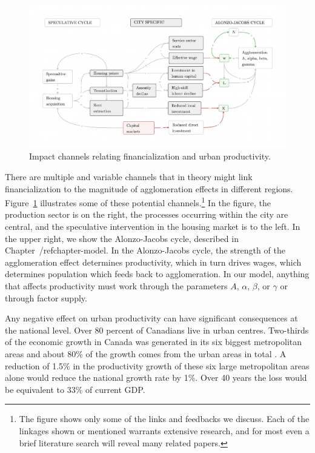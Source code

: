 \begin{figure}[h!tb]\label{fig-impact-channels}
\begin{adjustwidth}{-0.24\textwidth}{-0.24\textwidth}
\centering
\includegraphics[scale=.15 ]{fig/impact-channels.png}%
\end{adjustwidth}
\caption{Impact channels relating financialization and urban productivity.}
\end{figure}

There are multiple and variable channels that in theory might link financialization to the magnitude of agglomeration effects in different regions. Figure~\ref{fig-impact-channels} illustrates some of these potential channels.\footnote{The figure shows only some of the links and feedbacks we discuss. Each of the linkages shown or mentioned warrants extensive research, and for most even a brief literature search will reveal many related papers.} 
In the figure, the production sector is on the right, the processes occurring within the city are central, and the speculative intervention in the housing market is to the left. In the upper right, we show the \gls{Alonzo-Jacobs cycle}, described in Chapter~/ref{chapter-model}. In the Alonzo-Jacobs cycle, the strength of the agglomeration effect determines productivity, which in turn drives wages, which determines population which feeds back to agglomeration. In our model, anything that affects productivity must work through the parameters $A$, $\alpha$, $\beta$, or $\gamma$ or through factor supply. 

Any negative effect on urban productivity can have significant consequences at the national level. Over 80 percent of Canadians live in urban centres. Two-thirds of the economic growth in Canada was generated in its six biggest metropolitan areas and about 80\% of the growth comes from the urban areas in total \cite{w.fanImportanceCitiesEmphasis2010}. A reduction of 1.5\% in the productivity growth of these six large metropolitan areas alone would reduce the national growth rate by 1\%. Over 40 years the loss would be equivalent to 33\% of current GDP.

